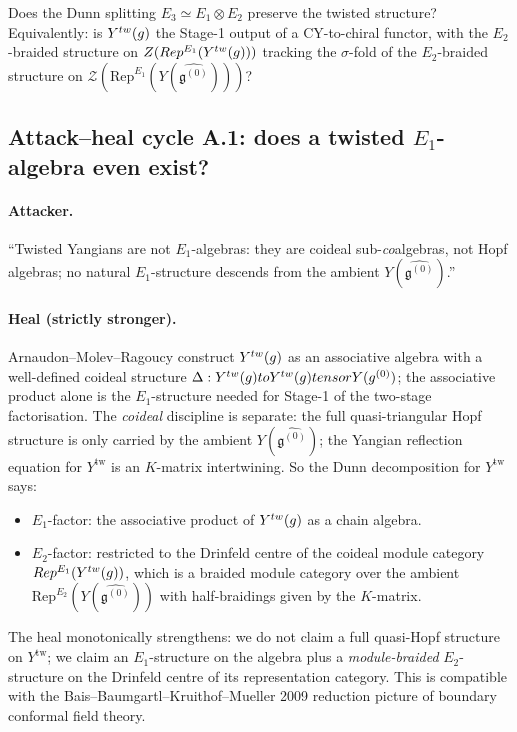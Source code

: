 \documentclass[11pt]{article}
\newcommand{\Eone}{E_{1}}
\newcommand{\Etwo}{E_{2}}
\newcommand{\Ethree}{E_{3}}
\newcommand{\cZ}{\mathcal{Z}}
\newcommand{\Rep}{\mathrm{Rep}}
\newcommand{\frakg}{\mathfrak{g}}
\begin{document}
Does the Dunn splitting $\Ethree \simeq \Eone \otimes \Etwo$ preserve
the twisted structure? Equivalently: is
$Y^{\mathrm{tw}}(\widehat\frakg)$ the Stage-1 output of a CY-to-chiral
functor, with the $\Etwo$-braided structure on
$\cZ(\Rep^{\Eone}(Y^{\mathrm{tw}}(\widehat\frakg)))$ tracking the
$\sigma$-fold of the $\Etwo$-braided structure on
$\cZ(\Rep^{\Eone}(Y(\widehat{\frakg^{(0)}})))$?

\subsection{Attack--heal cycle A.1: does a twisted $\Eone$-algebra
  even exist?}

\paragraph{Attacker.}
``Twisted Yangians are not $\Eone$-algebras: they are coideal
sub-\emph{co}algebras, not Hopf algebras; no natural $\Eone$-structure
descends from the ambient $Y(\widehat{\frakg^{(0)}})$.''

\paragraph{Heal (strictly stronger).}
Arnaudon--Molev--Ragoucy construct $Y^{\mathrm{tw}}(\widehat\frakg)$ as
an associative algebra with a well-defined coideal structure
$\Delta \colon Y^{\mathrm{tw}}(\widehat\frakg) \to
Y^{\mathrm{tw}}(\widehat\frakg) \otimes Y(\widehat{\frakg^{(0)}})$; the
associative product alone is the $\Eone$-structure needed for Stage-1
of the two-stage factorisation. The \emph{coideal} discipline is
separate: the full quasi-triangular Hopf structure is only carried by
the ambient $Y(\widehat{\frakg^{(0)}})$; the Yangian reflection
equation for $Y^{\mathrm{tw}}$ is an $K$-matrix intertwining. So the
Dunn decomposition for $Y^{\mathrm{tw}}$ says:
\begin{itemize}
\item $\Eone$-factor: the associative product of
  $Y^{\mathrm{tw}}(\widehat\frakg)$ as a chain algebra.
\item $\Etwo$-factor: restricted to the Drinfeld centre of the coideal
  module category $\Rep^{\Eone}(Y^{\mathrm{tw}}(\widehat\frakg))$, which
  is a braided module category over the ambient
  $\Rep^{\Etwo}(Y(\widehat{\frakg^{(0)}}))$ with half-braidings
  given by the $K$-matrix.
\end{itemize}
The heal monotonically strengthens: we do not claim a full quasi-Hopf
structure on $Y^{\mathrm{tw}}$; we claim an $\Eone$-structure on the
algebra plus a \emph{module-braided} $\Etwo$-structure on the
Drinfeld centre of its representation category. This is compatible
with the Bais--Baumgartl--Kruithof--Mueller 2009 reduction picture of
boundary conformal field theory.
\end{document}
